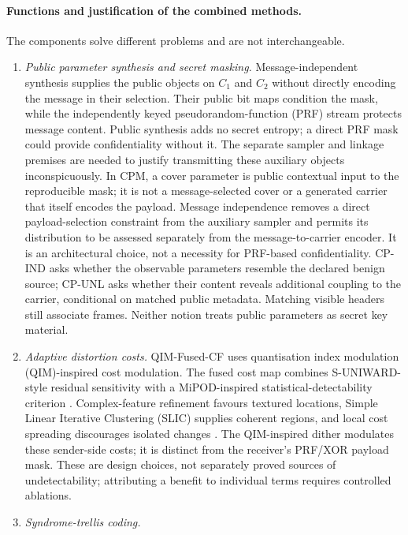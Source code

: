 \documentclass[pdflatex,sn-mathphys-num]{sn-jnl}%
\theoremstyle{definition}
\theoremstyle{game}
\theoremstyle{thmstyleone}%
\theoremstyle{thmstyletwo}%
\theoremstyle{thmstylethree}%
\begin{document}
\paragraph{Functions and justification of the combined methods.}
The components solve different problems and are not interchangeable.
\begin{enumerate}[label=(\roman*),leftmargin=2.1em,itemsep=0.3em]
\item \emph{Public parameter synthesis and secret masking.}
Message-independent synthesis supplies the public objects on $C_1$ and
$C_2$ without directly encoding the message in their selection. Their
public bit maps condition the mask, while the independently keyed pseudorandom-function (PRF)
stream protects message content. Public synthesis adds no secret entropy;
a direct PRF mask could provide confidentiality without it. The separate
sampler and linkage premises are needed to justify transmitting these
auxiliary objects inconspicuously. In CPM, a cover parameter is public
contextual input to the reproducible mask; it is not a message-selected
cover or a generated carrier that itself encodes the payload. Message
independence removes a direct payload-selection constraint from the
auxiliary sampler and permits its distribution to be assessed separately
from the message-to-carrier encoder. It is an architectural choice, not a
necessity for PRF-based confidentiality. CP-IND asks whether the observable
parameters resemble the declared benign source; CP-UNL asks whether their
content reveals additional coupling to the carrier, conditional on matched
public metadata. Matching visible headers still associate frames. Neither
notion treats public parameters as secret key material.
\item \emph{Adaptive distortion costs.}
QIM-Fused-CF uses quantisation index modulation (QIM)-inspired
cost modulation. The fused cost map combines S-UNIWARD-style residual sensitivity with a
MiPOD-inspired statistical-detectability criterion
\cite{holub2014universal,sedighi2015content}. Complex-feature refinement favours
textured locations, Simple Linear Iterative Clustering (SLIC) supplies
coherent regions, and local cost
spreading discourages isolated changes \cite{setiadi2025maximizing,achanta2012slic,li2014new}.
The QIM-inspired dither modulates these sender-side costs; it is distinct
from the receiver's PRF/XOR payload mask. These are design choices, not
separately proved sources of undetectability; attributing a benefit to
individual terms requires controlled ablations.
\item \emph{Syndrome-trellis coding.}

\end{enumerate}
\end{document}
